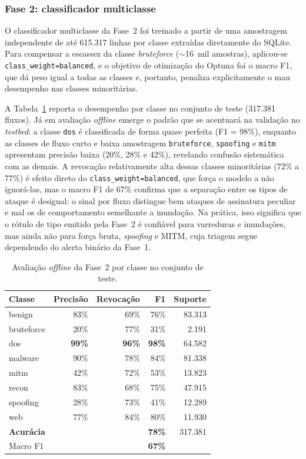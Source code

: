 \documentclass[12pt,a4paper]{article}
\begin{document}
\subsubsection{Fase 2: classificador multiclasse}

O classificador multiclasse da Fase~2 foi treinado a partir de uma
amostragem independente de até 615.317 linhas por classe extraídas diretamente do
SQLite. Para compensar a escassez da classe \textit{bruteforce}
($\sim$16~mil amostras), aplicou-se \texttt{class\_weight=balanced}, e o objetivo
de otimização do Optuna foi o macro F1, que dá peso igual a todas as classes e,
portanto, penaliza explicitamente o mau desempenho nas classes minoritárias.

A Tabela~\ref{tab:phase2_offline} reporta o desempenho por classe no conjunto de
teste (317.381 fluxos). Já em avaliação \textit{offline} emerge o padrão que se
acentuará na validação no \textit{testbed}: a classe \texttt{dos} é classificada
de forma quase perfeita (F1 = 98\%), enquanto as classes de fluxo curto e baixa
amostragem \texttt{bruteforce}, \texttt{spoofing} e \texttt{mitm} apresentam
precisão baixa (20\%, 28\% e 42\%), revelando confusão sistemática com as
demais. A revocação relativamente alta dessas classes minoritárias (72\% a
77\%) é efeito direto do \texttt{class\_weight=balanced}, que força o modelo a
não ignorá-las, mas o macro F1 de 67\% confirma que a separação entre os tipos
de ataque é desigual: o sinal por fluxo distingue bem ataques de assinatura
peculiar e mal os de comportamento semelhante a inundação. Na prática, isso
significa que o rótulo de tipo emitido pela Fase~2 é confiável para varreduras
e inundações, mas ainda não para força bruta, \textit{spoofing} e MITM, cuja
triagem segue dependendo do alerta binário da Fase~1.

\begin{table}[ht]
\centering
\caption{Avaliação \textit{offline} da Fase~2 por classe no conjunto de teste.}
\label{tab:phase2_offline}
\begin{tabular}{@{}lrrrr@{}}
\toprule
\textbf{Classe} & \textbf{Precisão} & \textbf{Revocação} & \textbf{F1} & \textbf{Suporte} \\ \midrule
benign      & 83\% & 69\% & 76\% & 83.313 \\
bruteforce  & 20\% & 77\% & 31\% &  2.191 \\
dos         & \textbf{99\%} & \textbf{96\%} & \textbf{98\%} & 64.582 \\
malware     & 90\% & 78\% & 84\% & 81.338 \\
mitm        & 42\% & 72\% & 53\% & 13.823 \\
recon       & 83\% & 68\% & 75\% & 47.915 \\
spoofing    & 28\% & 73\% & 41\% & 12.289 \\
web         & 77\% & 84\% & 80\% & 11.930 \\ \midrule
\textbf{Acurácia} & & & \textbf{78\%} & 317.381 \\
Macro F1    & & & \textbf{67\%} & \\
\bottomrule
\end{tabular}
\end{table}
\end{document}
